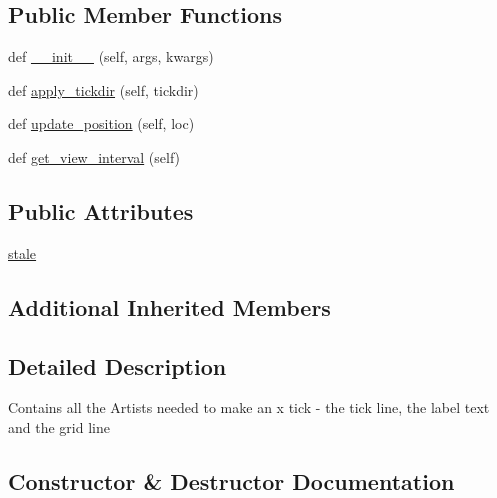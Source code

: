 \subsection*{Public Member Functions}
\begin{DoxyCompactItemize}
\item 
def \hyperlink{classmatplotlib_1_1axis_1_1XTick_a7a960f16bae321c6b99920cec4fde850}{\+\_\+\+\_\+init\+\_\+\+\_\+} (self, args, kwargs)
\item 
def \hyperlink{classmatplotlib_1_1axis_1_1XTick_ab579a99bce5bd99c677a8e789b0fae42}{apply\+\_\+tickdir} (self, tickdir)
\item 
def \hyperlink{classmatplotlib_1_1axis_1_1XTick_a44e7a90814912ec49f68e7e452107d8a}{update\+\_\+position} (self, loc)
\item 
def \hyperlink{classmatplotlib_1_1axis_1_1XTick_a9cdc485632c4142235f13a9cea410d4b}{get\+\_\+view\+\_\+interval} (self)
\end{DoxyCompactItemize}
\subsection*{Public Attributes}
\begin{DoxyCompactItemize}
\item 
\hyperlink{classmatplotlib_1_1axis_1_1XTick_aa2bfb2742747701a38c07851004acd4d}{stale}
\end{DoxyCompactItemize}
\subsection*{Additional Inherited Members}


\subsection{Detailed Description}
\begin{DoxyVerb}Contains all the Artists needed to make an x tick - the tick line,
the label text and the grid line
\end{DoxyVerb}
 

\subsection{Constructor \& Destructor Documentation}
\mbox{\label{classmatplotlib_1_1axis_1_1XTick_a7a960f16bae321c6b99920cec4fde850}} 
